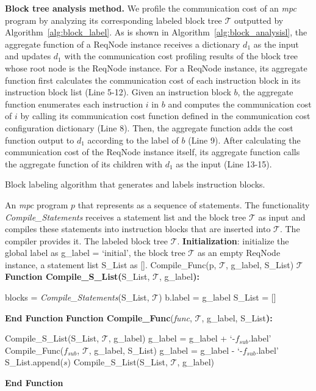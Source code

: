 \noindent\textbf{Block tree analysis method.} We profile the communication cost of an \textit{mpc} program by analyzing its corresponding labeled block tree $\mathcal{T}$ outputted by Algorithm~\ref{alg:block_label}. 
As is shown in Algorithm~\ref{alg:block_analysisl}, the aggregate function of a ReqNode instance receives a dictionary $d_1$ as the input and updates $d_1$ with the communication cost profiling results of the block tree whose root node is the ReqNode instance. For a ReqNode instance, its aggregate function first calculates the communication cost of each instruction block in its instruction block list (Line 5-12). Given an instruction block $b$, the aggregate function enumerates each instruction $i$ in $b$ and computes the communication cost of $i$ by calling its communication cost function defined in the communication cost configuration dictionary (Line 8). Then, the aggregate function adds the cost function output to $d_1$ according to the label of $b$ (Line 9). After calculating the communication cost of the ReqNode instance itself, its aggregate function calls the aggregate function of its children with $d_1$ as the input (Line 13-15).

\begin{algorithm}[htbp]
\small
\caption{Block labeling algorithm that generates and labels instruction blocks. }
\label{alg:block_label}
 \begin{algorithmic}[1]
    \REQUIRE An \textit{mpc} program $p$ that represents as a sequence of statements. The functionality \textit{Compile\_Statements} receives a statement list and the block tree $\mathcal{T}$ as input and compiles these statements into instruction blocks that are inserted into $\mathcal{T}$. The \mpspdz compiler provides it.
    \ENSURE The labeled block tree $\mathcal{T}$.
    \STATE \textbf{Initialization}: initialize the global label as g\_label = `initial', the block tree $\mathcal{T}$ as an empty ReqNode instance, a statement list S\_List as []. 
    \STATE Compile\_Func(p, $\mathcal{T}$, g\_label, S\_List)
    \RETURN $\mathcal{T}$
    \STATE\textbf{Function Compile\_S\_List(}S\_List, $\mathcal{T}$, g\_label\textbf{):}
    \begin{ALC@g}
    \STATE blocks = \textit{Compile\_Statements}(S\_List, $\mathcal{T}$)
    \STATE b.label = g\_label
    \ENDFOR
    \STATE S\_List = []
    \end{ALC@g}
    \STATE \textbf{End Function}
    \STATE\textbf{Function Compile\_Func}(\textit{func}, $\mathcal{T}$, g\_label, S\_List\textbf{):}
    \begin{ALC@g}
    \STATE Compile\_S\_List(S\_List, $\mathcal{T}$, g\_label)
    \STATE g\_label = g\_label + `-$f_{sub}$.label'
    \STATE Compile\_Func($f_{sub}$, $\mathcal{T}$, g\_label, S\_List)
    \STATE g\_label = g\_label - `-$f_{sub}$.label'
    \ELSE
    \STATE S\_List.append($s$)
    \ENDIF
    \ENDFOR
    \STATE Compile\_S\_List(S\_List, $\mathcal{T}$, g\_label)
    \end{ALC@g}
    \STATE\textbf{End Function}
\end{algorithmic}
\end{algorithm}


